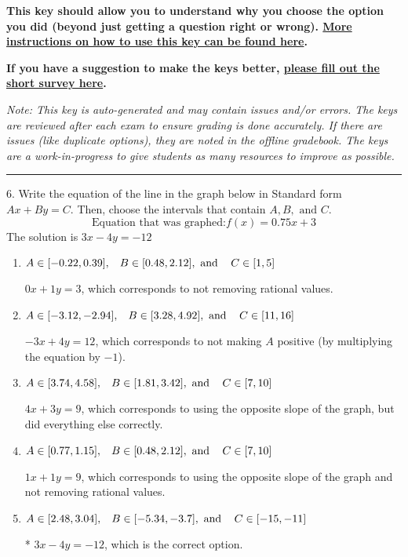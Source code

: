 \documentclass{extbook}[14pt]
\begin{document}
\textbf{This key should allow you to understand why you choose the option you did (beyond just getting a question right or wrong). \href{https://xronos.clas.ufl.edu/mac1105spring2020/courseDescriptionAndMisc/Exams/LearningFromResults}{More instructions on how to use this key can be found here}.}

\textbf{If you have a suggestion to make the keys better, \href{https://forms.gle/CZkbZmPbC9XALEE88}{please fill out the short survey here}.}

\textit{Note: This key is auto-generated and may contain issues and/or errors. The keys are reviewed after each exam to ensure grading is done accurately. If there are issues (like duplicate options), they are noted in the offline gradebook. The keys are a work-in-progress to give students as many resources to improve as possible.}

\rule{\textwidth}{0.4pt}

6. Write the equation of the line in the graph below in Standard form $Ax+By=C$. Then, choose the intervals that contain $A, B, \text{ and } C$.
\[ \text{Equation that was graphed:} f(x)= 0.75 x + 3 \] 
The solution is $ 3 x - 4 y = -12 $ 

\begin{enumerate}[label=\Alph*.] 
\item $ A \in [-0.22, 0.39], \hspace{3mm} B \in [0.48, 2.12], \text{ and } \hspace{3mm} C \in [1, 5] $ 

  $0x + 1y = 3$, which corresponds to not removing rational values. 
\item $ A \in [-3.12, -2.94], \hspace{3mm} B \in [3.28, 4.92], \text{ and } \hspace{3mm} C \in [11, 16] $ 

  $-3x + 4y = 12$, which corresponds to not making $A$ positive (by multiplying the equation by $-1$). 
\item $ A \in [3.74, 4.58], \hspace{3mm} B \in [1.81, 3.42], \text{ and } \hspace{3mm} C \in [7, 10] $ 

  $4x + 3y = 9$, which corresponds to using the opposite slope of the graph, but did everything else correctly. 
\item $ A \in [0.77, 1.15], \hspace{3mm} B \in [0.48, 2.12], \text{ and } \hspace{3mm} C \in [7, 10] $ 

  $1x + 1y = 9$, which corresponds to using the opposite slope of the graph and not removing rational values. 
\item $ A \in [2.48, 3.04], \hspace{3mm} B \in [-5.34, -3.7], \text{ and } \hspace{3mm} C \in [-15, -11] $ 

 * $3x - 4y = -12$, which is the correct option. 
\end{enumerate} 
 
\end{document}
